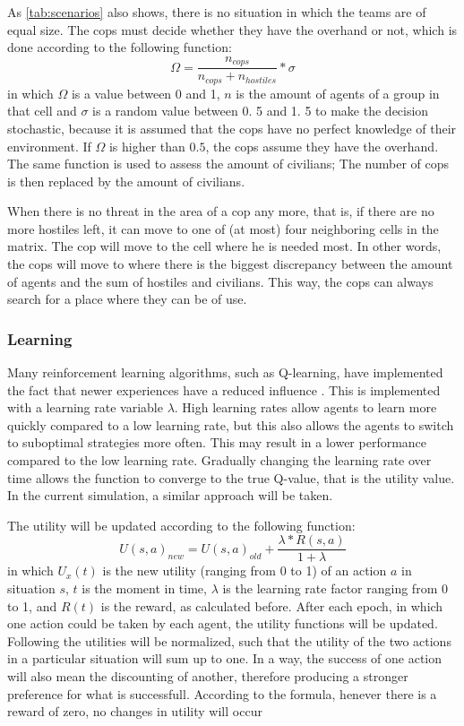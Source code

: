 As \autoref{tab:scenarios} also shows, there is no situation in which the teams are of equal size.
The cops must decide whether they have the overhand or not, which is done according to the following function:
$$ \Omega = \frac{n_{cops}}{n_{cops} + n_{hostiles}}*\sigma $$
in which $\Omega$ is a value between 0 and 1, $n$ is the amount of agents of a group in that cell and $\sigma$ is a random value between 0.
5 and 1.
5 to make the decision stochastic, because it is assumed that the cops have no perfect knowledge of their environment.
If $\Omega$ is higher than $0.
5$, the cops assume they have the overhand.
The same function is used to assess the amount of civilians; The number of cops is then replaced by the amount of civilians.


When there is no threat in the area of a cop any more, that is, if there are no more hostiles left, it can move to one of (at most) four neighboring cells in the matrix.
The cop will move to the cell where he is needed most.
In other words, the cops will move to where there is the biggest discrepancy between the amount of agents and the sum of hostiles and civilians.
This way, the cops can always search for a place where they can be of use.

\subsubsection{Learning}
Many reinforcement learning algorithms, such as Q-learning, have implemented the fact that newer experiences have a reduced influence  \citep*{watkins1992q}.
This is implemented with a learning rate variable $\lambda$.
High learning rates allow agents to learn more quickly compared to a low learning rate, but this also allows the agents to switch to suboptimal strategies more often.
This may result in a lower performance compared to the low learning rate.
Gradually changing the learning rate over time allows the function to converge to the true Q-value, that is the utility value.
In the current simulation, a similar approach will be taken.


The utility will be updated according to the following function:
$$ U(s,a)_{new} = U(s,a)_{old} + \frac{\lambda * R(s,a)}{1+\lambda} $$
in which $U_x(t)$ is the new utility (ranging from 0 to 1) of an action $a$ in situation $s$, $t$ is the moment in time, $\lambda$ is the learning rate factor ranging from 0 to 1, and $R(t)$ is the reward, as calculated before.
After each epoch, in which one action could be taken by each agent, the utility functions will be updated.
Following the utilities will be normalized, such that the utility of the two actions in a particular situation will sum up to one.
In a way, the success of one action will also mean the discounting of another, therefore producing a stronger preference for what is successfull.
According to the formula, henever there is a reward of zero, no changes in utility will occur


